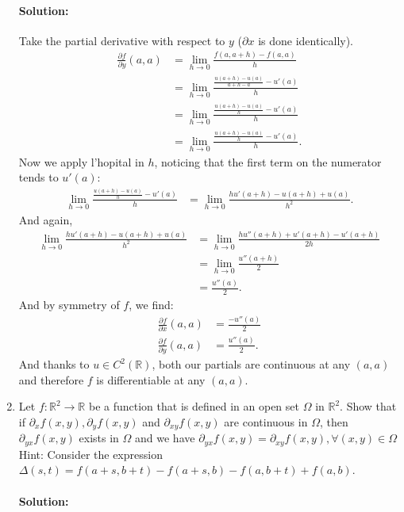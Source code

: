 \documentclass{article}
\begin{document}
\begin{enumerate}
    \paragraph{Solution: }Take the partial derivative with respect to $y$ ($\partial x$ is done identically).
    \begin{align*}
        \frac{\partial f}{\partial y}(a,a) &= \lim_{h \to 0} \frac{f(a,a+h)-f(a,a)  }{h} \\
        &= \lim_{h \to 0} \frac{ \frac{u(a+h)-u(a)}{a+h-a}-u'(a)}{h} \\
        &= \lim_{h \to 0} \frac{ \frac{u(a+h)-u(a)}{h}-u'(a)}{h} \\
        &= \lim_{h \to 0} \frac{ \frac{u(a+h)-u(a)}{h}-u'(a)}{h}
    .\end{align*}
    Now we apply l'hopital in $h$, noticing that the first term on the numerator tends to $u'(a)$:
    \begin{align*}
        \lim_{h \to 0} \frac{ \frac{u(a+h)-u(a)}{h}-u'(a)}{h}
        &=\lim_{h \to 0} \frac{hu'(a+h)-u(a+h)+u(a)}{h^2}
    .\end{align*}
    And again,
    \begin{align*}
        \lim_{h \to 0} \frac{hu'(a+h)-u(a+h)+u(a)}{h^2}&=\lim_{h \to 0} \frac{hu''(a+h)+u'(a+h)-u'(a+h)}{2h}\\
        &= \lim_{h \to 0}  \frac{u''(a+h)}{2} \\
        &= \frac{u''(a)}{2}
    .\end{align*}
    And by symmetry of $f$, we find:
    \begin{align*}
        \frac{\partial f}{\partial x}(a,a) &= \frac{-u''(a)}{2}\\
        \frac{\partial f}{\partial y}(a,a) &= \frac{u''(a)}{2}
    .\end{align*}
    And thanks to $u\in C^2(\mathbb{R})$, both our partials are continuous at any $(a,a)$ and therefore $f$ is differentiable at any $(a,a)$.
    

\item Let $f : \mathbb{R}^2 \to \mathbb{R}$ be a function that is defined in an open set $\Omega$ in $\mathbb{R}^2$.  Show that if $\partial_x f(x,y), \partial_y f(x,y)$ and $\partial_{xy} f(x,y)$ are continuous in $\Omega$, then $\partial_{yx} f(x,y)$ exists in $\Omega$ and we have  $\partial_{yx} f(x,y) = \partial_{xy} f(x,y), \forall (x,y) \in \Omega$  Hint: Consider the expression $\Delta(s,t) = f(a+s,b+t) - f(a+s,b) - f(a,b+t) + f(a,b)$.  
    \paragraph{Solution: } %


\end{enumerate}
\end{document}
